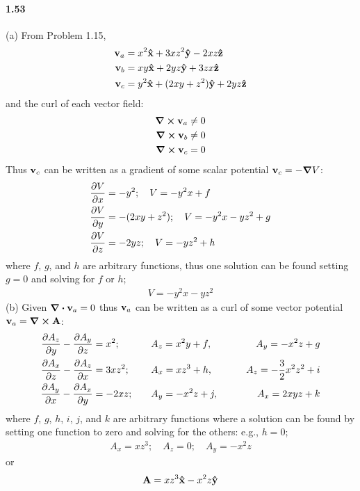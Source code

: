 \documentclass[../main.tex]{subfiles}
\begin{document}
\paragraph{1.53}
(a) From Problem 1.15,
\begin{align*}
    \vb{v}_a &= x^2\vu{x} + 3xz^2\vu{y} - 2xz\vu{z} \\
    \vb{v}_b &= xy\vu{x} + 2yz\vu{y} + 3zx\vu{z} \\
    \vb{v}_c &= y^2\vu{x} + (2xy + z^2)\vu{y} + 2yz\vu{z} \\
\end{align*}
and the curl of each vector field:
\begin{align*}
    \curl \vb{v}_a &\neq 0 \\
    \curl \vb{v}_b &\neq 0 \\
    \curl \vb{v}_c &= 0
\end{align*}
Thus $\vb{v}_c$ can be written as a gradient of some scalar potential $\vb{v}_c = -\grad V$:
\begin{align*}
    \pdv{V}{x} &= -y^2 ;\quad V = -y^2 x + f \\
    \pdv{V}{y} &= -(2xy + z^2) ;\quad V = -y^2 x - yz^2 + g \\
    \pdv{V}{z} &= -2yz ;\quad V = -yz^2 + h 
\end{align*}
where $f$, $g$, and $h$ are arbitrary functions, thus one solution can be found setting $g = 0$ and
solving for $f$ or $h$; 
\begin{align*}
    V = -y^2 x - yz^2
\end{align*}
(b) Given $\div \vb{v}_a = 0$ thus $\vb{v}_a$ can be written as a curl of some vector potential
$\vb{v}_a = \curl \vb{A}$:
\begin{alignat*}{4}
    \pdv{A_z}{y} - \pdv{A_y}{z} &= x^2 ;\quad &&A_z = x^2y + f ,\quad &&&A_y = -x^2z + g \\
    \pdv{A_x}{z} - \pdv{A_z}{x} &= 3xz^2 ;\quad &&A_x = xz^3+ h ,\quad &&&A_z = -\frac{3}{2} x^2z^2 + i \\
    \pdv{A_y}{x} - \pdv{A_x}{y} &= -2xz ;\quad &&A_y = -x^2z + j ,\quad &&&A_x = 2xyz + k 
\end{alignat*}
where $f$, $g$, $h$, $i$, $j$, and $k$ are arbitrary functions where a solution can be found by 
setting one function to zero and solving for the others: e.g., $h = 0$;
\begin{align*}
    A_x = xz^3 ;\quad A_z = 0 ;\quad A_y = -x^2z
\end{align*}
or
\begin{align*}
    \vb{A} = xz^3 \vu{x} - x^2z \vu{y}
\end{align*}
\end{document}
